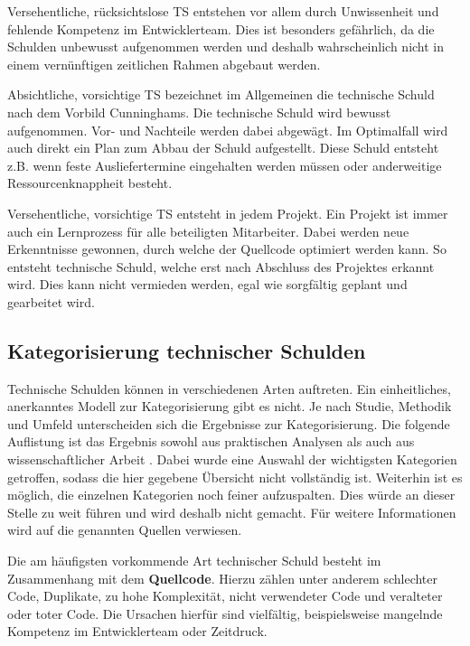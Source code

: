 \documentclass[acmtog]{acmart}
\begin{document}
Versehentliche, rücksichtslose TS entstehen vor allem durch Unwissenheit und
fehlende Kompetenz im Entwicklerteam. Dies ist besonders gefährlich, da die
Schulden unbewusst aufgenommen werden und deshalb wahrscheinlich nicht in
einem vernünftigen zeitlichen Rahmen abgebaut werden.

Absichtliche, vorsichtige TS bezeichnet im Allgemeinen die technische Schuld
nach dem Vorbild Cunninghams. Die technische Schuld wird bewusst aufgenommen.
Vor- und Nachteile werden dabei abgewägt. Im Optimalfall wird auch direkt ein
Plan zum Abbau der Schuld aufgestellt. Diese Schuld entsteht z.B. wenn feste
Ausliefertermine eingehalten werden müssen oder anderweitige
Ressourcenknappheit besteht.

Versehentliche, vorsichtige TS entsteht in jedem Projekt. Ein Projekt ist
immer auch ein Lernprozess für alle beteiligten Mitarbeiter. Dabei werden
neue Erkenntnisse gewonnen, durch welche der Quellcode optimiert werden kann.
So entsteht technische Schuld, welche erst nach Abschluss des Projektes
erkannt wird. Dies kann nicht vermieden werden, egal wie sorgfältig geplant
und gearbeitet wird.

\subsection{Kategorisierung technischer Schulden}\label{sec:KategorisierungTS}

Technische Schulden können in verschiedenen Arten auftreten. Ein einheitliches,
anerkanntes  Modell zur Kategorisierung gibt es nicht. Je nach Studie, Methodik
und Umfeld unterscheiden sich die Ergebnisse zur Kategorisierung. Die
folgende Auflistung ist das Ergebnis sowohl aus praktischen Analysen \cite{Jaspan23} als
auch aus wissenschaftlicher Arbeit \cite{Li14}. Dabei wurde eine Auswahl der
wichtigsten Kategorien getroffen, sodass die hier gegebene Übersicht nicht
vollständig ist. Weiterhin ist es möglich, die einzelnen Kategorien noch
feiner aufzuspalten. Dies würde an dieser Stelle zu weit führen und wird
deshalb nicht gemacht. Für weitere Informationen wird auf die genannten
Quellen verwiesen.

Die am häufigsten vorkommende Art technischer Schuld besteht im Zusammenhang
mit dem \textbf{Quellcode}. Hierzu zählen unter anderem schlechter Code, Duplikate,
zu hohe Komplexität, nicht verwendeter Code und veralteter oder toter Code.
Die Ursachen hierfür sind vielfältig, beispielsweise mangelnde Kompetenz im
Entwicklerteam oder Zeitdruck.
\end{document}
